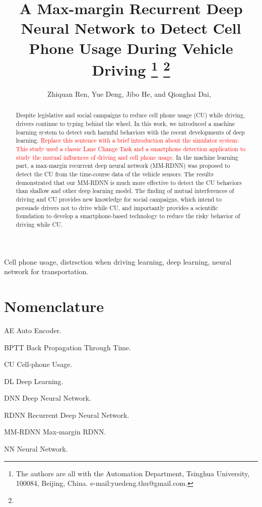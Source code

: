 \documentclass[journal]{IEEEtran}
\begin{document}
\title{A Max-margin Recurrent Deep Neural Network to Detect Cell Phone Usage During Vehicle Driving
\thanks{ The authors are all with the Automation Department, Tsinghua University, 100084, Beijing, China. e-mail:yuedeng.thu@gmail.com.}
\thanks{
}}

\author{Zhiquan Ren, Yue Deng, Jibo He,
        and Qionghai Dai,~}%



%
{ }

\maketitle


\begin{abstract}
Despite legislative and social campaigns to reduce cell phone usage (CU) while driving, drivers continue to typing behind the wheel. In this work, we  introduced a machine learning system to detect such harmful behaviors with the recent developments of deep learning.  \textcolor{red}{Replace this sentence with a brief introduction about the simulator system: This study used a classic Lane Change Task and a smartphone detection application to study the mutual influences of driving and cell phone usage. } In the machine learning part, a max-margin recurrent deep neural network (MM-RDNN) was proposed to detect the CU from the time-course data of the vehicle sensors. The results demonstrated that our MM-RDNN is much more effective to detect the CU behaviors than  shallow and  other deep learning model. The finding of mutual interferences of driving and CU provides new knowledge for social campaigns, which intend to persuade drivers not to drive while CU, and importantly provides a scientific foundation to develop a smartphone-based technology to reduce the risky behavior of driving while CU.
\end{abstract}

\begin{IEEEkeywords}
Cell phone usage, distrsction when driving learning,  deep learning, neural network for transportation.
\end{IEEEkeywords}

\IEEEpeerreviewmaketitle
\section*{Nomenclature}
\begin{IEEEdescription}
\item[AE]  Auto Encoder.
\item[BPTT] Back Propagation Through Time.
\item[CU] Cell-phone Usage.
\item [DL] Deep Learning.
\item[DNN] Deep Neural Network.
\item[RDNN] Recurrent Deep Neural Network.
\item[MM-RDNN] Max-margin RDNN.
\item[NN] Neural Network.
\end{IEEEdescription}
\end{document}

